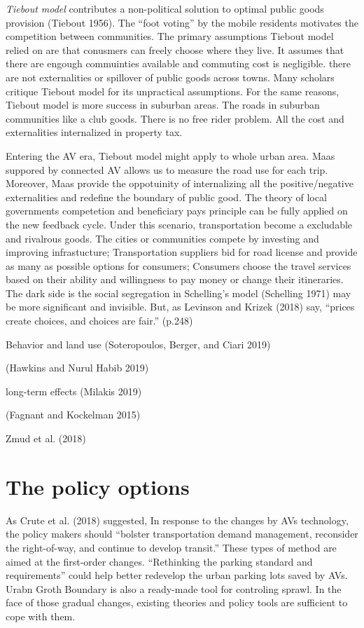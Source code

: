 \documentclass[12pt,]{article}
\begin{document}
\emph{Tiebout model} contributes a non-political solution to optimal
public goods provision (Tiebout 1956). The ``foot voting'' by the mobile
residents motivates the competition between communities. The primary
assumptions Tiebout model relied on are that conusmers can freely choose
where they live. It assumes that there are engough commuinties available
and commuting cost is negligible. there are not externalities or
spillover of public goods across towns. Many scholars critique Tiebout
model for its unpractical assumptions. For the same reasons, Tiebout
model is more success in suburban areas. The roads in suburban
communities like a club goods. There is no free rider problem. All the
cost and externalities internalized in property tax.

Entering the AV era, Tiebout model might apply to whole urban area. Maas
suppored by connected AV allows us to measure the road use for each
trip. Moreover, Maas provide the oppotuinity of internalizing all the
positive/negative externalities and redefine the boundary of public
good. The theory of local governments competetion and beneficiary pays
principle can be fully applied on the new feedback cycle. Under this
scenario, transportation become a excludable and rivalrous goods. The
cities or communities compete by investing and improving infrastucture;
Transportation suppliers bid for road license and provide as many as
possible options for consumers; Consumers choose the travel services
based on their ability and willingness to pay money or change their
itineraries. The dark side is the social segregation in Schelling's
model (Schelling 1971) may be more significant and invisible. But, as
Levinson and Krizek (2018) say, ``prices create choices, and choices are
fair.'' (p.248)

Behavior and land use (Soteropoulos, Berger, and Ciari 2019)

(Hawkins and Nurul Habib 2019)

long-term effects (Milakis 2019)

(Fagnant and Kockelman 2015)

Zmud et al. (2018)

\hypertarget{the-policy-options}{%
\section{The policy options}\label{the-policy-options}}

As Crute et al. (2018) suggested, In response to the changes by AVs
technology, the policy makers should ``bolster transportation demand
management, reconsider the right-of-way, and continue to develop
transit.'' These types of method are aimed at the first-order changes.
``Rethinking the parking standard and requirements'' could help better
redevelop the urban parking lots saved by AVs. Urabn Groth Boundary is
also a ready-made tool for controling sprawl. In the face of those
gradual changes, existing theories and policy tools are sufficient to
cope with them.
\end{document}
